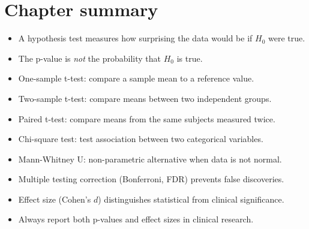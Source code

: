 \section{Chapter summary}

\begin{itemize}
  \item A hypothesis test measures how surprising the data would be if $H_0$ were true.
  \item The p-value is \emph{not} the probability that $H_0$ is true.
  \item One-sample t-test: compare a sample mean to a reference value.
  \item Two-sample t-test: compare means between two independent groups.
  \item Paired t-test: compare means from the same subjects measured twice.
  \item Chi-square test: test association between two categorical variables.
  \item Mann-Whitney U: non-parametric alternative when data is not normal.
  \item Multiple testing correction (Bonferroni, FDR) prevents false discoveries.
  \item Effect size (Cohen's $d$) distinguishes statistical from clinical significance.
  \item Always report both p-values and effect sizes in clinical research.
\end{itemize}
